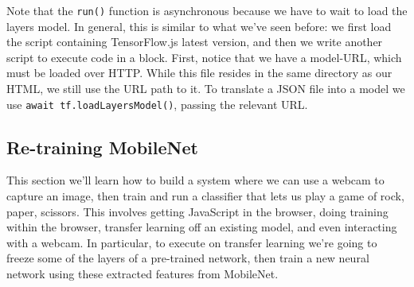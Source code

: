 \documentclass[12pt]{article}
\begin{document}


Note that the \texttt{run()} function is asynchronous because we have to wait to load the layers model. In general, this is similar to what we've seen before: we first load the script containing TensorFlow.js latest version, and then we write another script to execute code in a block. First, notice that we have a model-URL, which must be loaded over HTTP. While this file resides in the same directory as our HTML, we still use the URL path to it. To translate a JSON file into a model we use \texttt{await tf.loadLayersModel()}, passing the relevant URL.

\subsection{Re-training MobileNet}
This section we'll learn how to build a system where we can use a webcam to capture an image, then train and run a classifier that lets us play a game of rock, paper, scissors. This involves getting JavaScript in the browser, doing training within the browser, transfer learning off an existing model, and even interacting with a webcam. In particular, to execute on transfer learning we're going to freeze some of the layers of a pre-trained network, then train a new neural network using these extracted features from MobileNet.
\end{document}
